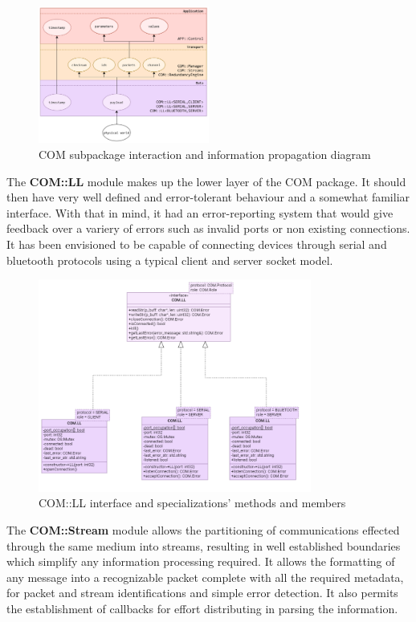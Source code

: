 \begin{figure}[H]
	\centering
	\includegraphics[width=0.5\textwidth]{./img/module-stack-com.png}
	\caption {COM subpackage interaction and information propagation diagram}
	\label{fig:navig-module-stack-com}
	\end{figure}



The \textbf{COM::LL} module makes up the lower layer of the COM package. It should then have very well defined and error-tolerant behaviour and a somewhat familiar interface. With that in mind, it had an error-reporting system that would give feedback over a variery of errors such as invalid ports or non existing connections. It has been envisioned to be capable of connecting devices through serial and bluetooth protocols using a typical client and server socket model.

\begin{figure}[H]
	\centering
	\includegraphics[width=0.8\textwidth]{./img/navig-class-ll.png}
	\caption {COM::LL interface and specializations' methods and members}
	\label{fig:navig-class-ll}
	\end{figure}


The \textbf{COM::Stream} module allows the partitioning of communications effected through the same medium into streams, resulting in well established boundaries which simplify any information processing required. It allows the formatting of any message into a recognizable packet complete with all the required metadata, for packet and stream identifications and simple error detection. It also permits the establishment of callbacks for effort distributing in parsing the information.

